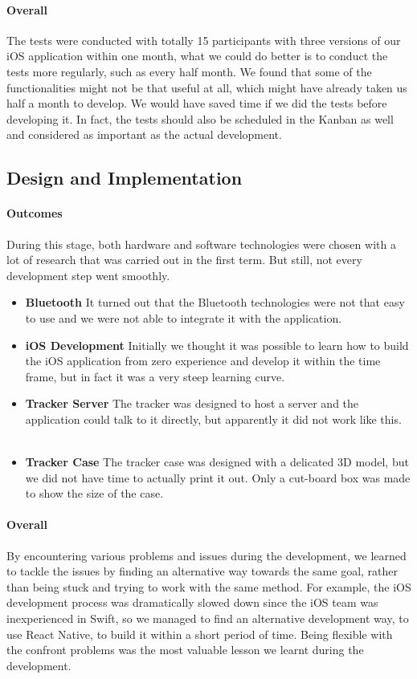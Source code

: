 \documentclass[12pt,a4paper]{article}
\begin{document}
        \paragraph{Overall} The tests were conducted with totally 15 participants with three versions of our iOS application within one month, what we could do better is to conduct the tests more regularly, such as every half month. We found that some of the functionalities might not be that useful at all, which might have already taken us half a month to develop. We would have saved time if we did the tests before developing it. In fact, the tests should also be scheduled in the Kanban as well and considered as important as the actual development.

      \subsection{Design and Implementation}
        \paragraph{Outcomes} During this stage, both hardware and software technologies were chosen with a lot of research that was carried out in the first term. But still, not every development step went smoothly. 
        \begin{itemize}
          \item {\bf Bluetooth} It turned out that the Bluetooth technologies were not that easy to use and we were not able to integrate it with the application. 
          \item {\bf iOS Development} Initially we thought it was possible to learn how to build the iOS application from zero experience and develop it within the time frame, but in fact it was a very steep learning curve.
          \item {\bf Tracker Server} The tracker was designed to host a server and the application could talk to it directly, but apparently it did not work like this.
          \item {\bf Tracker Case} The tracker case was designed with a delicated 3D model, but we did not have time to actually print it out. Only a cut-board box was made to show the size of the case.
        \end{itemize}

        \paragraph{Overall} By encountering various problems and issues during the development, we learned to tackle the issues by finding an alternative way towards the same goal, rather than being stuck and trying to work with the same method. For example, the iOS development process was dramatically slowed down since the iOS team was inexperienced in Swift, so we managed to find an alternative development way, to use React Native, to build it within a short period of time. Being flexible with the confront problems was the most valuable lesson we learnt during the development. 
        
\end{document}

